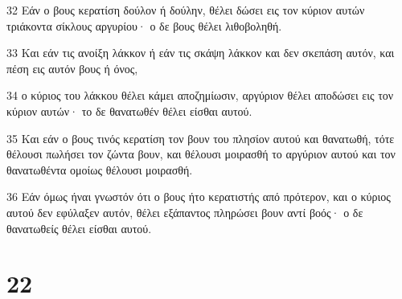\par 32 Εάν ο βους κερατίση δούλον ή δούλην, θέλει δώσει εις τον κύριον αυτών τριάκοντα σίκλους αργυρίου· ο δε βους θέλει λιθοβοληθή.
\par 33 Και εάν τις ανοίξη λάκκον ή εάν τις σκάψη λάκκον και δεν σκεπάση αυτόν, και πέση εις αυτόν βους ή όνος,
\par 34 ο κύριος του λάκκου θέλει κάμει αποζημίωσιν, αργύριον θέλει αποδώσει εις τον κύριον αυτών· το δε θανατωθέν θέλει είσθαι αυτού.
\par 35 Και εάν ο βους τινός κερατίση τον βουν του πλησίον αυτού και θανατωθή, τότε θέλουσι πωλήσει τον ζώντα βουν, και θέλουσι μοιρασθή το αργύριον αυτού και τον θανατωθέντα ομοίως θέλουσι μοιρασθή.
\par 36 Εάν όμως ήναι γνωστόν ότι ο βους ήτο κερατιστής από πρότερον, και ο κύριος αυτού δεν εφύλαξεν αυτόν, θέλει εξάπαντος πληρώσει βουν αντί βοός· ο δε θανατωθείς θέλει είσθαι αυτού.

\chapter{22}

